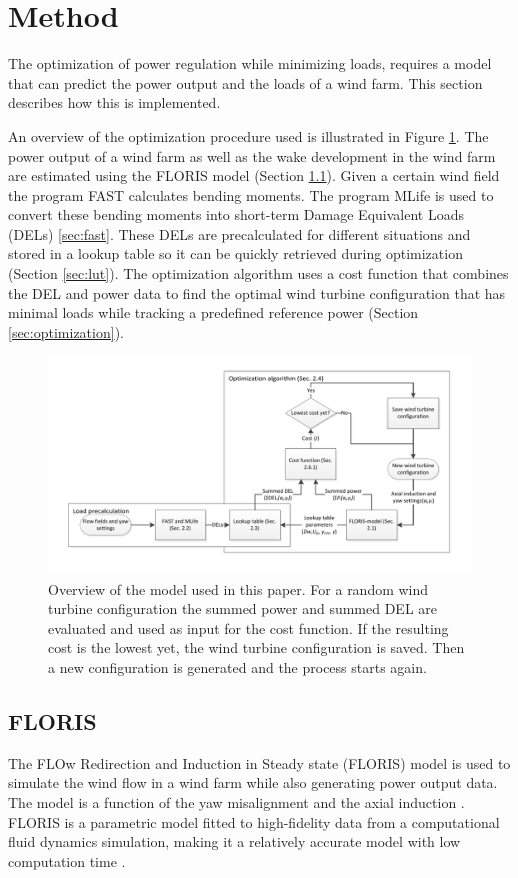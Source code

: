 \section{Method} \label{sec:method}
The optimization of power regulation while minimizing loads, requires a model that can predict the power output and the loads of a wind farm. This section describes how this is implemented.

An overview of the optimization procedure used is illustrated in Figure \ref{fig:optim}.
The power output of a wind farm as well as the wake development in the wind farm are estimated using the FLORIS model \cite{Gebraad2016} (Section \ref{sec:floris}). Given a certain wind field the program FAST calculates bending moments. The program MLife is used to convert these bending moments into short-term Damage Equivalent Loads (DELs) \ref{sec:fast}. These DELs are precalculated for different situations and stored in a lookup table so it can be quickly retrieved during optimization (Section \ref{sec:lut}). The optimization algorithm uses a cost function that combines the DEL and power data to find the optimal wind turbine configuration that has minimal loads while tracking a predefined reference power (Section \ref{sec:optimization}).

\begin{figure}
	\includegraphics[width=\linewidth]{./Figures/OptimizationProcess.pdf}
	\caption{Overview of the model used in this paper. For a random wind turbine configuration the summed power and summed DEL are evaluated and used as input for the cost function. If the resulting cost is the lowest yet, the wind turbine configuration is saved. Then a new configuration is generated and the process starts again.}
	\label{fig:optim}
\end{figure}



\subsection{FLORIS} \label{sec:floris} The FLOw Redirection and Induction in Steady state (FLORIS) model is used to simulate the wind flow in a wind farm while also generating power output data. The model is a function of the yaw misalignment and the axial induction \cite{Gebraad2016}. FLORIS is a parametric model fitted to high-fidelity data from a computational fluid dynamics simulation, making it a relatively accurate model with low computation time \cite{Dijk2016}. 

